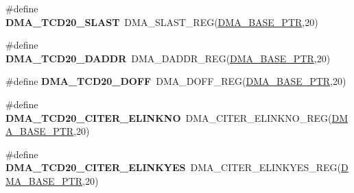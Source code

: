 \begin{DoxyCompactItemize}
\item 
\hypertarget{group___d_m_a___register___accessor___macros_ga4033e44b59020bcd6b283688b8ffb77b}{}\#define {\bfseries D\+M\+A\+\_\+\+T\+C\+D20\+\_\+\+S\+L\+A\+S\+T}~D\+M\+A\+\_\+\+S\+L\+A\+S\+T\+\_\+\+R\+E\+G(\hyperlink{group___d_m_a___peripheral_ga6997fbc1b1973e9f27170217a3bd6f22}{D\+M\+A\+\_\+\+B\+A\+S\+E\+\_\+\+P\+T\+R},20)\label{group___d_m_a___register___accessor___macros_ga4033e44b59020bcd6b283688b8ffb77b}

\item 
\hypertarget{group___d_m_a___register___accessor___macros_ga793419f0ece32ef6e7c6c2639efffd25}{}\#define {\bfseries D\+M\+A\+\_\+\+T\+C\+D20\+\_\+\+D\+A\+D\+D\+R}~D\+M\+A\+\_\+\+D\+A\+D\+D\+R\+\_\+\+R\+E\+G(\hyperlink{group___d_m_a___peripheral_ga6997fbc1b1973e9f27170217a3bd6f22}{D\+M\+A\+\_\+\+B\+A\+S\+E\+\_\+\+P\+T\+R},20)\label{group___d_m_a___register___accessor___macros_ga793419f0ece32ef6e7c6c2639efffd25}

\item 
\hypertarget{group___d_m_a___register___accessor___macros_ga7300199cbf401db08613de0cec607710}{}\#define {\bfseries D\+M\+A\+\_\+\+T\+C\+D20\+\_\+\+D\+O\+F\+F}~D\+M\+A\+\_\+\+D\+O\+F\+F\+\_\+\+R\+E\+G(\hyperlink{group___d_m_a___peripheral_ga6997fbc1b1973e9f27170217a3bd6f22}{D\+M\+A\+\_\+\+B\+A\+S\+E\+\_\+\+P\+T\+R},20)\label{group___d_m_a___register___accessor___macros_ga7300199cbf401db08613de0cec607710}

\item 
\hypertarget{group___d_m_a___register___accessor___macros_ga414120d041141e142481a2b52bfed8c4}{}\#define {\bfseries D\+M\+A\+\_\+\+T\+C\+D20\+\_\+\+C\+I\+T\+E\+R\+\_\+\+E\+L\+I\+N\+K\+N\+O}~D\+M\+A\+\_\+\+C\+I\+T\+E\+R\+\_\+\+E\+L\+I\+N\+K\+N\+O\+\_\+\+R\+E\+G(\hyperlink{group___d_m_a___peripheral_ga6997fbc1b1973e9f27170217a3bd6f22}{D\+M\+A\+\_\+\+B\+A\+S\+E\+\_\+\+P\+T\+R},20)\label{group___d_m_a___register___accessor___macros_ga414120d041141e142481a2b52bfed8c4}

\item 
\hypertarget{group___d_m_a___register___accessor___macros_ga8e01b790996e12e95f3c4ad150bc6074}{}\#define {\bfseries D\+M\+A\+\_\+\+T\+C\+D20\+\_\+\+C\+I\+T\+E\+R\+\_\+\+E\+L\+I\+N\+K\+Y\+E\+S}~D\+M\+A\+\_\+\+C\+I\+T\+E\+R\+\_\+\+E\+L\+I\+N\+K\+Y\+E\+S\+\_\+\+R\+E\+G(\hyperlink{group___d_m_a___peripheral_ga6997fbc1b1973e9f27170217a3bd6f22}{D\+M\+A\+\_\+\+B\+A\+S\+E\+\_\+\+P\+T\+R},20)\label{group___d_m_a___register___accessor___macros_ga8e01b790996e12e95f3c4ad150bc6074}


\end{DoxyCompactItemize}

